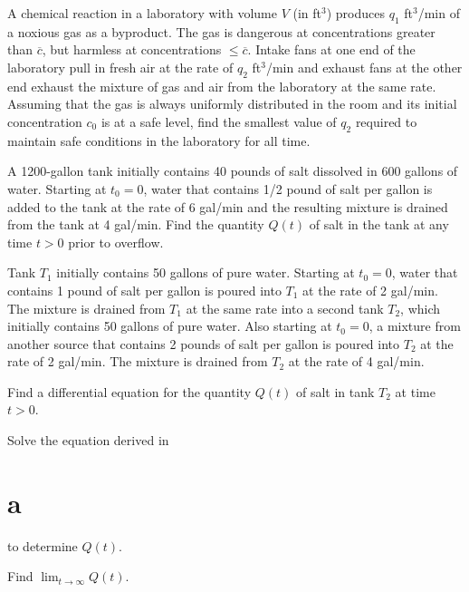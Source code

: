 \begin{exerciselist}
  \item\label{exer:4.2.13} A chemical reaction in a laboratory with volume $V$ (in ft$^{3}$)
        produces $q_{1}$ ft$^{3}$/min of a noxious gas as a byproduct. The gas is dangerous at
        concentrations greater than $\overline{c}$, but harmless at concentrations
        $\le\overline{c}$. Intake fans at one end of the laboratory pull in fresh air at the rate of
        $q_{2}$ ft$^{3}$/min and exhaust fans at the other end exhaust the mixture of gas and air
        from the laboratory at the same rate. Assuming that the gas is always uniformly distributed
        in the room and its initial concentration $c_{0}$ is at a safe level, find the smallest
        value of $q_{2}$ required to maintain safe conditions in the laboratory for all time.

  \item\label{exer:4.2.14} A 1200-gallon tank initially contains 40 pounds of salt dissolved in 600
        gallons of water. Starting at $t_{0}=0$, water that contains 1/2 pound of salt per gallon is
        added to the tank at the rate of 6 gal/min and the resulting mixture is drained from the
        tank at 4 gal/min. Find the quantity $Q(t)$ of salt in the tank at any time $t>0$ prior to
        overflow.

  \item\label{exer:4.2.15} Tank $T_{1}$ initially contains 50 gallons of pure water. Starting at
        $t_{0}=0$, water that contains 1 pound of salt per gallon is poured into $T_{1}$ at the rate
        of 2 gal/min. The mixture is drained from $T_{1}$ at the same rate into a second tank
        $T_{2}$, which initially contains 50 gallons of pure water. Also starting at $t_{0}=0$, a
        mixture from another source that contains 2 pounds of salt per gallon is poured into $T_{2}$
        at the rate of 2 gal/min. The mixture is drained from $T_{2}$ at the rate of 4 gal/min.

  \begin{alist}
    \item %
    Find a differential equation for the quantity $Q(t)$ of salt in tank $T_{2}$ at time $t>0$.

    \item %
    Solve the equation derived in \part{a}
    to determine $Q(t)$.

    \item %
    Find $\lim_{t\to\infty}Q(t)$.
  \end{alist}


\end{exerciselist}
